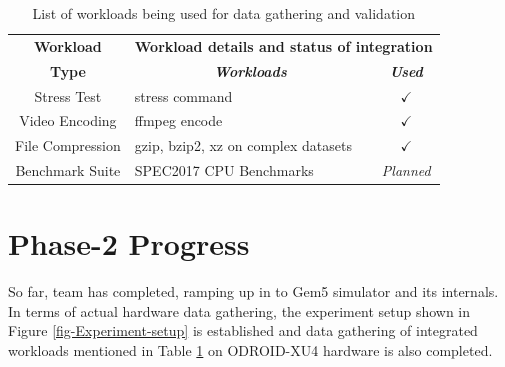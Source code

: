 \documentclass[conference]{IEEEtran}
\begin{document}
        \begin{table}[htbp]
            \caption{List of workloads being used for data gathering and validation}
            \begin{center}
                \begin{tabular}{|c|p{4.4cm}|p{0.5cm}|}
                    \hline
                    \textbf{Workload}&\multicolumn{2}{|c|}{\textbf{Workload details and status  of integration}} \\
                    \cline{2-3} 
                    \textbf{Type} & \multicolumn{1}{|c|}{\textbf{\textit{Workloads}}} & \multicolumn{1}{|c|}{\textbf{\textit{Used}}}  \\
                    \hline
                    Stress Test & stress command \cite{linux-stress-testing} & \multicolumn{1}{|c|}{$\checkmark$} \\
                    \hline
                    Video Encoding & ffmpeg encode \cite{linux-stress-testing} & \multicolumn{1}{|c|}{$\checkmark$} \\
                    \hline
                    File Compression & gzip, bzip2, xz on complex datasets \cite{compression-benchmarking} & \multicolumn{1}{|c|}{$\checkmark$} \\
                    \hline
                    Benchmark Suite & SPEC2017 CPU Benchmarks \cite{10.1145/3185768.3185771} & \multicolumn{1}{|c|}{\textit{Planned}} \\
                    \hline
                \end{tabular}
                \label{Workload-listing}
            \end{center}
        \end{table}

\section{Phase-2 Progress}
    \par So far, team has completed, ramping up in to Gem5 simulator and its internals. In terms of actual hardware data gathering, the experiment setup shown in Figure \ref{fig-Experiment-setup} is established and data gathering of integrated workloads mentioned in Table \ref{Workload-listing} on ODROID-XU4 hardware is also completed.
\end{document}
